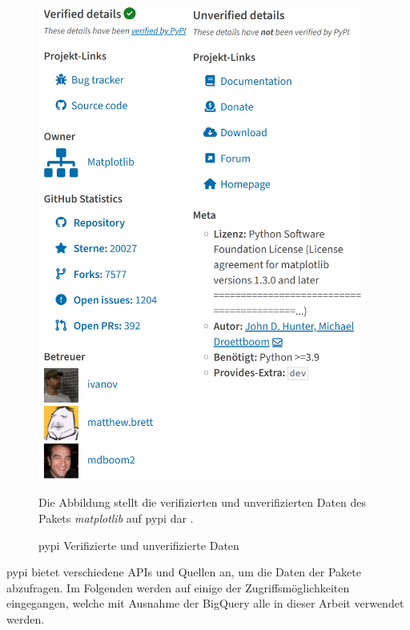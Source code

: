 \begin{figure}
    \begin{center}
        \includegraphics[width=0.95\textwidth]{bilder/pypi.png}
    \end{center}
    \caption{\gls{pypi} Verifizierte und unverifizierte Daten}
    \label{fig:pypi_verified_unverified_details}
    \small
    Die Abbildung stellt die verifizierten und unverifizierten Daten des Pakets \emph{matplotlib} auf \gls{pypi} dar \autocite{python_software_foundation_pypi_2024}.
\end{figure}

\gls{pypi} bietet verschiedene APIs und Quellen an, um die Daten der Pakete abzufragen.
Im Folgenden werden auf einige der Zugriffsmöglichkeiten eingegangen, welche mit Ausnahme der BigQuery alle in dieser Arbeit verwendet werden.

